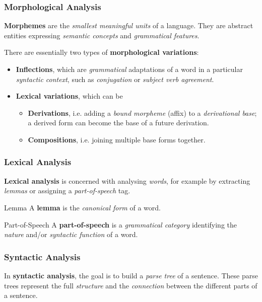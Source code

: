 \subsubsection{Morphological Analysis}
\begin{mydef}[Morpheme]
	\textbf{Morphemes} are the \emph{smallest meaningful units} of a language.
	They are abstract entities expressing \emph{semantic concepts} and \emph{grammatical features}.
\end{mydef}
There are essentially two types of \textbf{morphological variations}:
\begin{itemize}
	\item \textbf{Inflections}, which are \emph{grammatical} adaptations of a word in a particular \emph{syntactic context}, such as \emph{conjugation} or \emph{subject verb agreement}.
	\item \textbf{Lexical variations}, which can be \begin{itemize}
		\item \textbf{Derivations}, i.e. adding a \emph{bound morpheme} (affix) to a \emph{derivational base}; a derived form can become the base of a future derivation.
		\item \textbf{Compositions}, i.e. joining multiple base forms together.
	\end{itemize}
\end{itemize}

\subsubsection{Lexical Analysis}
\textbf{Lexical analysis} is concerned with analysing \emph{words}, for example by extracting \emph{lemmas} or assigning a \emph{part-of-speech} tag.
\begin{mydef}{Lemma}
	A \textbf{lemma} is the \emph{canonical form} of a word.
\end{mydef}

\begin{mydef}{Part-of-Speech}
	A \textbf{part-of-speech} is a \emph{grammatical category} identifying the \emph{nature} and/or \emph{syntactic function} of a word.
\end{mydef}

\subsubsection{Syntactic Analysis}
In \textbf{syntactic analysis}, the goal is to build a \emph{parse tree} of a sentence.
These parse trees represent the full \emph{structure} and the \emph{connection} between the different parts of a sentence.


